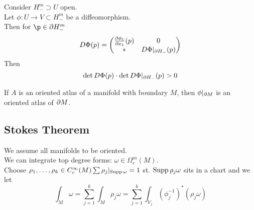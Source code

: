 \documentclass[../main.tex]{subfiles}
\begin{document}
\begin{lemma}
Consider $H^{m}_- \supset U$ open.\\
Let $\phi:U\to V \subset H^{m}_-$ be a diffeomorphism.\\
Then for $\p \in \del H_-^{m}$ 
\[ 
D\Phi( p) =
\begin{pmatrix}
	\frac{\partial \phi_1}{\partial x_1}( p) & 0 \\
	\ast & D\Phi|_{\partial H_-} ( p) 
\end{pmatrix} 
\]
Then
\[ 
\det D\Phi( p) \cdot \det D\Phi|_{\partial H_-} ( p) >0
\]

\end{lemma}
\begin{crly}
If $A$ is an oriented atlas of a manifold with boundary $M$, then $\phi|_{\partial M} $ is an oriented atlas of $\partial M$.
\end{crly}
\subsection{Stokes Theorem}
We assume all manifolds to be oriented.\\
We can integrate top degree forms: $\omega \in \Omega_c^{m }( M) $.\\
Choose $\rho_1,\ldots,\rho_k \in C_c^{ \infty }( M) \sum \rho_j |_{\operatorname{Supp} \omega} =1$ st. $\operatorname{Supp} \rho_j \omega$ 	sits in a chart and we let
\[ 
\int_{ M }^{  }\omega = \sum_{j=1}^{k} \int_M \rho_j\omega = \sum_{j=1}^{ k}\int_{ V_j }^{  }( \phi_j^{-1})^{\ast}( \rho_j \omega) 
\]
\end{document}
